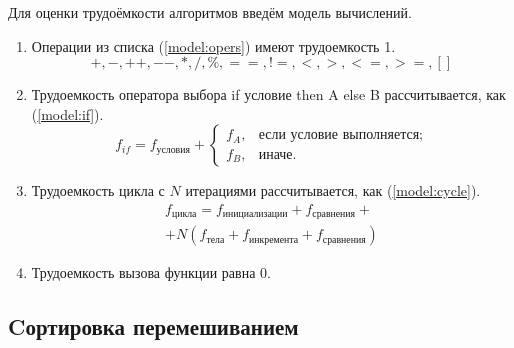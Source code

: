 Для оценки трудоёмкости алгоритмов введём модель вычислений.
\begin{enumerate}
	\item Операции из списка (\ref{model:opers}) имеют трудоемкость 1.
	\begin{equation}
		\label{model:opers}
		+, -, ++, {-}-, *, /, \%, ==, !=, <, >, <=, >=, []
	\end{equation}
	\item Трудоемкость оператора выбора if условие then A else B рассчитывается, как (\ref{model:if}).
	\begin{equation}
		\label{model:if}
		f_{if} = f_{\text{условия}} +
		\begin{cases}
			f_A, & \text{если условие выполняется;}\\
			f_B, & \text{иначе.}
		\end{cases}
	\end{equation}
	\item Трудоемкость цикла с $N$ итерациями рассчитывается, как (\ref{model:cycle}).
	\begin{equation}
		\label{model:cycle}
		\begin{gathered}
			f_{\text{цикла}} = f_{\text{инициализации}} + f_{\text{сравнения}} + \\
			+ N(f_{\text{тела}} + f_{\text{инкремента}} + f_{\text{сравнения}})
		\end{gathered}
	\end{equation}
	\item Трудоемкость вызова функции равна 0.
\end{enumerate}

\subsection{Cортировка перемешиванием}

